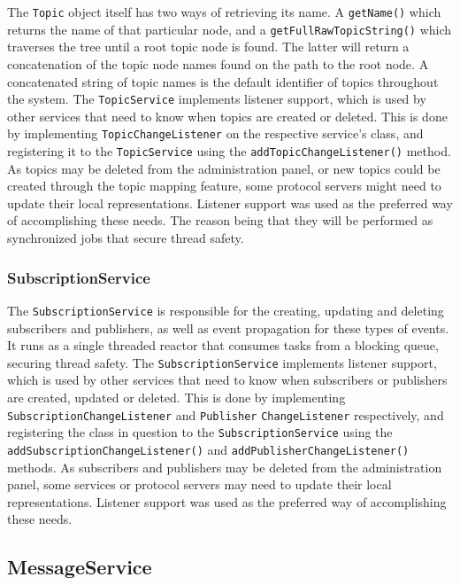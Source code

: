 The \verb!Topic! object itself has two ways of retrieving its name. A \verb!getName()! which returns the name of that particular node, and a \verb!getFullRawTopicString()! which traverses the tree until a root topic node is found. The latter will return a concatenation of the topic node names found on the path to the root node. A concatenated string of topic names is the default identifier of topics throughout the system.
The \verb!TopicService! implements listener support, which is used by other services that need to know when topics are created or deleted. This is done by implementing \verb!TopicChangeListener! on the respective service's class, and registering it to the \verb!TopicService! using the \verb!addTopicChangeListener()! method.
As topics may be deleted from the administration panel, or new topics could be created through the topic mapping feature, some protocol servers might need to update their local representations. Listener support was used as the preferred way of accomplishing these needs. The reason being that they will be performed as synchronized jobs that secure thread safety.

\subsubsection{SubscriptionService}
\label{subsec:architecture_and_implementation-implementation-core-subscriptionservice}

The \verb!SubscriptionService! is responsible for the creating, updating and deleting subscribers and publishers, as well as event propagation for these types of events. It runs as a single threaded reactor that consumes tasks from a blocking queue, securing thread safety. The \verb!SubscriptionService! implements listener support, which is used by other services that need to know when subscribers or publishers are created, updated or deleted. This is done by implementing \verb!SubscriptionChangeListener! and \verb!Publisher! \verb!ChangeListener! respectively, and registering the class in question to the \verb!SubscriptionService! using the \verb!addSubscriptionChangeListener()! and  \verb!addPublisherChangeListener()! methods. As subscribers and publishers may be deleted from the administration panel, some services or protocol servers may need to update their local representations. Listener support was used as the preferred way of accomplishing these needs.

\subsection{MessageService}
\label{subsec:architecture_and_implementation-implementation-core-messageservice}

